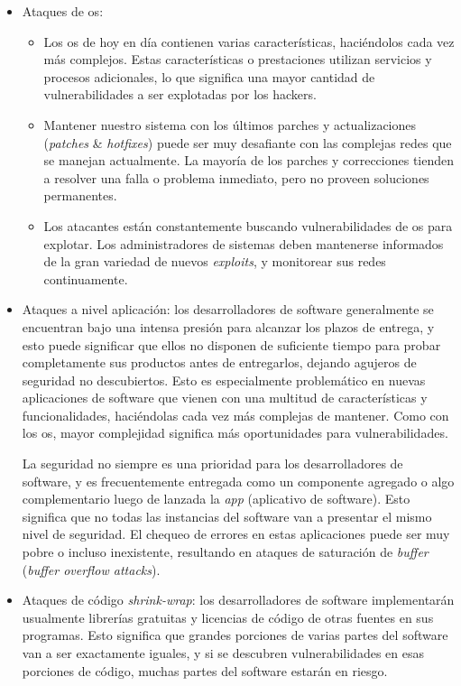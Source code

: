 \documentclass[a4paper,12pt]{report}
\begin{document}
\begin{itemize}
\item Ataques de \ac{os}:
  \begin{itemize}
   \item Los \ac{os} de hoy en día contienen varias
características, haciéndolos cada vez más complejos. Estas características o
prestaciones utilizan servicios y procesos adicionales, lo que significa una
mayor cantidad de vulnerabilidades a ser explotadas por los hackers.
  \item Mantener nuestro sistema con los últimos parches y
actualizaciones (\emph{patches} \& \emph{\mbox{hotfixes}}) puede ser muy desafiante con
las complejas redes que se manejan actualmente. La mayoría de los parches y correcciones
tienden a resolver una falla o problema inmediato, pero no proveen soluciones
permanentes.
  \item Los atacantes están constantemente buscando vulnerabilidades de
\ac{os} para explotar. Los administradores de sistemas deben mantenerse informados 
de la gran variedad de nuevos \emph{exploits}, y monitorear sus redes continuamente. 
  \end{itemize}       

\item Ataques a nivel aplicación:
los desarrolladores de software generalmente se encuentran bajo una intensa
presión para alcanzar los plazos de entrega, y esto puede significar que ellos
no disponen de suficiente tiempo para probar completamente sus productos antes
de entregarlos, dejando agujeros de seguridad no descubiertos. Esto es
especialmente problemático en nuevas aplicaciones de software que vienen con
una multitud de características y funcionalidades, haciéndolas cada vez más
complejas de mantener. Como con los \ac{os}, mayor complejidad
significa más oportunidades para vulnerabilidades. 

La seguridad no siempre es una prioridad para los desarrolladores de software,
y es frecuentemente entregada como un componente agregado o algo complementario
luego de lanzada la \emph{app} (aplicativo de software). Esto significa que no todas las instancias del
software van a presentar el mismo nivel de seguridad. El chequeo de errores en
estas aplicaciones puede ser muy pobre o incluso inexistente, resultando en
ataques de saturación de \emph{buffer} (\emph{buffer overflow attacks}). 

\item Ataques de código \emph{shrink-wrap}:
los desarrolladores de software implementarán usualmente librerías gratuitas y
licencias de código de otras fuentes en sus programas. Esto significa que
grandes porciones de varias partes del software van a ser exactamente iguales,
y si se descubren vulnerabilidades en esas porciones de código, muchas partes
del software estarán en riesgo.  


\end{itemize}
\end{document}

